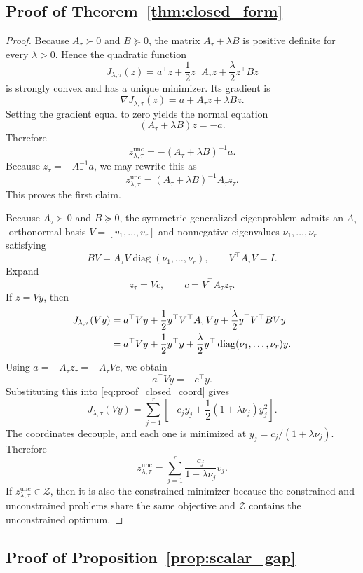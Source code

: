 \documentclass{article}
\newcommand{\cZ}{\mathcal{Z}}
\newcommand{\diag}{\operatorname{diag}}
\newcommand{\bracks}[1]{\left[ #1 \right]}
\begin{document}
\subsection{Proof of Theorem~\ref{thm:closed_form}}

\begin{proof}
Because \(A_\tau\succ 0\) and \(B\succeq 0\), the matrix \(A_\tau+\lambda B\) is positive definite for every \(\lambda>0\). Hence the quadratic function
\[
J_{\lambda,\tau}(z)=a^\top z + \frac12 z^\top A_\tau z + \frac{\lambda}{2} z^\top B z
\]
is strongly convex and has a unique minimizer. Its gradient is
\[
\nabla J_{\lambda,\tau}(z)=a + A_\tau z + \lambda Bz.
\]
Setting the gradient equal to zero yields the normal equation
\[
(A_\tau+\lambda B)z = -a.
\]
Therefore
\[
z_{\lambda,\tau}^{\mathrm{unc}} = -(A_\tau+\lambda B)^{-1}a.
\]
Because \(z_\tau=-A_\tau^{-1}a\), we may rewrite this as
\[
z_{\lambda,\tau}^{\mathrm{unc}} = (A_\tau+\lambda B)^{-1}A_\tau z_\tau.
\]
This proves the first claim.

Because \(A_\tau\succ 0\) and \(B\succeq 0\), the symmetric generalized eigenproblem admits an \(A_\tau\)-orthonormal basis \(V=[v_1,\dots,v_r]\) and nonnegative eigenvalues \(\nu_1,\dots,\nu_r\) satisfying
\[
BV = A_\tau V \diag(\nu_1,\dots,\nu_r),
\qquad
V^\top A_\tau V = I.
\]
Expand
\[
z_\tau = Vc,
\qquad
c = V^\top A_\tau z_\tau.
\]
If \(z=Vy\), then
\begin{align}
J_{\lambda,\tau}(Vy)
&=
a^\top Vy + \frac12 y^\top V^\top A_\tau V y + \frac{\lambda}{2} y^\top V^\top B V y \notag\\
&=
a^\top Vy + \frac12 y^\top y + \frac{\lambda}{2} y^\top \diag(\nu_1,\dots,\nu_r) y.
\label{eq:proof_closed_coord}
\end{align}
Using \(a=-A_\tau z_\tau=-A_\tau Vc\), we obtain
\[
a^\top Vy = -c^\top y.
\]
Substituting this into \eqref{eq:proof_closed_coord} gives
\[
J_{\lambda,\tau}(Vy)
=
\sum_{j=1}^r\bracks{-c_j y_j + \frac12 (1+\lambda\nu_j)y_j^2}.
\]
The coordinates decouple, and each one is minimized at \(y_j=c_j/(1+\lambda\nu_j)\). Therefore
\[
z_{\lambda,\tau}^{\mathrm{unc}}
=
\sum_{j=1}^r \frac{c_j}{1+\lambda\nu_j}v_j.
\]
If \(z_{\lambda,\tau}^{\mathrm{unc}}\in\cZ\), then it is also the constrained minimizer because the constrained and unconstrained problems share the same objective and \(\cZ\) contains the unconstrained optimum.
\end{proof}

\subsection{Proof of Proposition~\ref{prop:scalar_gap}}
\end{document}
